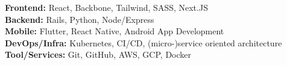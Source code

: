 \documentclass[margin,line]{resume}
\begin{document}
\begin{resume}
    \textbf{Frontend:} React, Backbone, Tailwind, SASS, Next.JS                                                     \\%
    \textbf{Backend:} Rails, Python, Node/Express                                                                   \\%
    \textbf{Mobile:} Flutter, React Native, Android App Development                                                 \\%
    \textbf{DevOps/Infra:} Kubernetes, CI/CD, (micro-)service oriented architecture                                 \\%
    \textbf{Tool/Services:} Git, GitHub, AWS, GCP, Docker                                                             %
\end{resume}
\end{document}
